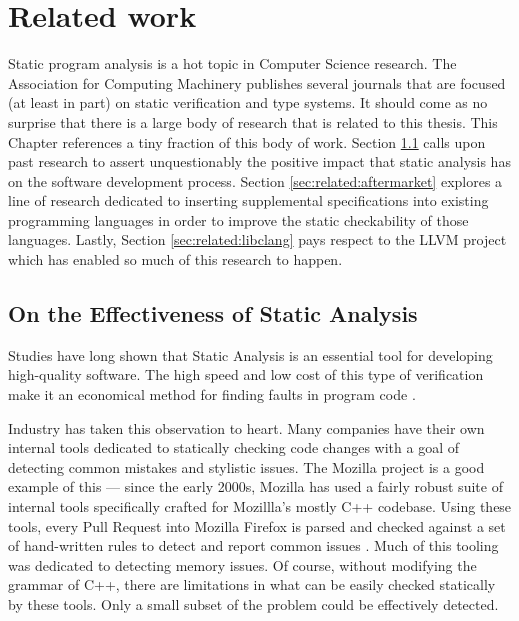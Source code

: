 \chapter{Related work}\label{sec:related}

Static program analysis is a hot topic in Computer Science research.  The Association for Computing Machinery publishes several journals that are focused (at least in part) on static verification and type systems.  It should come as no surprise that there is a large body of research that is related to this thesis.  This Chapter references a tiny fraction of this body of work.  Section \ref{sec:related:effectiveness} calls upon past research to assert unquestionably the positive impact that static analysis has on the software development process.  Section \ref{sec:related:aftermarket} explores a line of research dedicated to inserting supplemental specifications into existing programming languages in order to improve the static checkability of those languages.  Lastly, Section \ref{sec:related:libclang} pays respect to the LLVM project which has enabled so much of this research to happen.

\section{On the Effectiveness of Static Analysis}\label{sec:related:effectiveness}

Studies have long shown that Static Analysis is an essential tool for developing high-quality software.  The high speed and low cost of this type of verification make it an economical method for finding faults in program code \cite{staticanal, static-anal-experience}.  

Industry has taken this observation to heart.  Many companies have their own internal tools dedicated to statically checking code changes with a goal of detecting common mistakes and stylistic issues.  The Mozilla project is a good example of this --- since the early 2000s, Mozilla has used a fairly robust suite of internal tools specifically crafted for Mozillla's mostly C++ codebase.  Using these tools, every Pull Request into Mozilla Firefox is parsed and checked against a set of hand-written rules to detect and report common issues \cite{mozilla-pork-blog, moz-wiki-static-anal}.  Much of this tooling was dedicated to detecting memory issues.  Of course, without modifying the grammar of C++, there are limitations in what can be easily checked statically by these tools.  Only a small subset of the problem could be effectively detected.  

